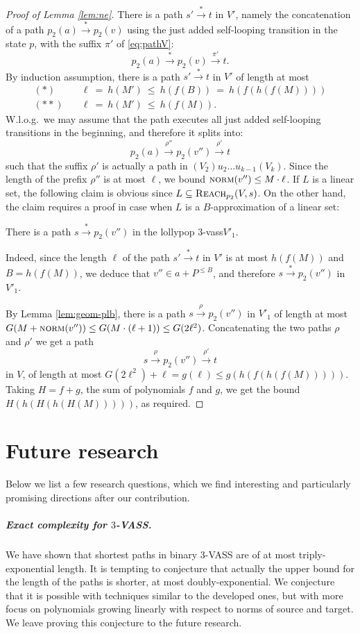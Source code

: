 \documentclass[a4paper, UKenglish, cleveref, autoref, thm-restate]{lipics-v2021}
\newcommand{\reach}{\textsc{Reach}}
\newcommand{\trans}[1]{\stackrel{#1}{\longrightarrow}}
\newcommand{\tran}{\trans{*}}
\newcommand{\norm}{\textsc{norm}}
\newcommand{\vass}{{\sc vass}\xspace}
\newcommand{\tvass}{\parvass 3}
\newcommand{\parvass}[1]{{$#1$-\vass}\xspace}
\newcommand{\ktvasstwo}{(V_2) u_2 \ldots u_{k-1} (V_k)}
\newcommand{\para}[1]{\vspace{-3mm}\subparagraph*{\bf #1.}}
\newcommand{\Wlog}{W.l.o.g.~}
\begin{document}
\begin{proof}[Proof of Lemma \ref{lem:ne}]
\smallskip

There is a path $s' \tran t$ in $V'$, namely the concatenation of  
a path $p_2(a) \tran p_2(v)$ using the 
just added self-looping transition in the state $p$, with the suffix $\pi'$ of \eqref{eq:pathV}:
\[
p_2(a) \tran p_2(v) \trans{\pi'} t.
\]
By induction assumption, there is a path $s' \tran t$ in $V'$ of length at most
\begin{align*}
(*) \quad & \ell \ = \ h(M') \ \leq \ h(f(B)) \ = \ h(f(h(f(M))))\\
(**) \quad &  \ell \ = \ h(M') \ \leq \ h(f(M)).
\end{align*}
\Wlog we may assume that the path executes all just added self-looping transitions in the beginning,
and therefore it splits into:
\[
p_2(a) \trans{\rho''} p_2(v'') \trans{\rho'} t
\]
such that the suffix $\rho'$ is actually a path in $\ktvasstwo$.
Since the length of the prefix $\rho''$ is at most $\ell$, 
we bound $\norm(v'') \leq M \cdot \ell$.
If $L$ is a linear set, the following claim is obvious since $L\subseteq\reach_{p_2}(V,s)$.
On the other hand, the claim requires a proof in case when $L$ is a $B$-approximation of a linear set:
\begin{claim}[$**$]
There is a path $s \tran p_2(v'')$ in the lollypop \tvass $V'_1$.
\end{claim}
Indeed,  
since the length $\ell$ of the path $s'\tran t$ in $V'$ is at most $h(f(M))$
and $B= h(f(M))$, we deduce that $v'' \in a + P^{\leq B}$, and therefore $s\tran p_2(v'')$ in $ V'_1$.

\smallskip

By Lemma \ref{lem:geom-plb}, there is a path $s\trans{\rho} p_2(v'')$ in $V'_1$ of length at most
$G(M + \norm(v'')) \leq G(M\cdot(\ell+1)) \leq G(2\ell^2)$.
Concatenating the two paths $\rho$ and $\rho'$ we get a path
\[
s\trans{\rho} p_2(v'') \trans{\rho'} t
\]
in $V$, of length at most 
$
G(2\ell^2) + \ell = g(\ell) \leq g(h(f(h(f(M))))).
$
Taking $H = f+g$, the sum of polynomials $f$ and $g$, we get the bound
$H(h(H(h(H(M)))))$,
as required.
\end{proof}
 

\section{Future research}\label{sec:future}
Below we list a few research questions, which we find interesting and
particularly promising directions after our contribution.

\para{Exact complexity for $3$-VASS}
We have shown that shortest paths in binary $3$-VASS are of at most triply-exponential length.
It is tempting to conjecture that actually the upper bound for the length of the paths is shorter,
at most doubly-exponential. We conjecture that it is possible with techniques similar to the developed ones,
but with more focus on polynomials growing linearly with respect to norms of source and target.
We leave proving this conjecture to the future research.
\end{document}
